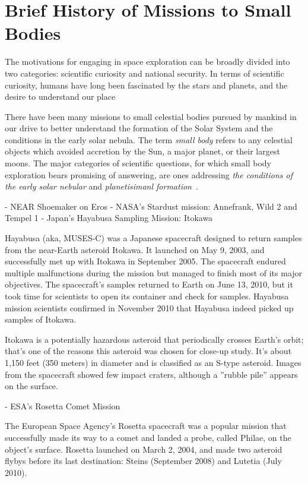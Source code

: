 \section{Brief History of Missions to Small Bodies}

The motivations for engaging in space exploration can be broadly divided into two categories: scientific curiosity and national security. In terms of scientific curiosity, humans have long been fascinated by the stars and planets, and the desire to understand our place

There have been many missions to small celestial bodies pursued by mankind in
our drive to better understand the formation of the Solar System and the
conditions in the early solar nebula. The term \textit{small body} refers to any
celestial objects which avoided accretion by the Sun, a major planet, or their
largest moons. The major categories of scientific questions, for which
small body exploration bears promising of answering, are ones addressing
\textit{the conditions of the early solar nebular} and \textit{planetisimanl
    formation}~\cite{Davidsson2021}.

- NEAR Shoemaker on Eros
- NASA's Stardust mission: Annefrank, Wild 2 and Tempel 1
- Japan's Hayabusa Sampling Mission: Itokawa

Hayabusa (aka, MUSES-C) was a Japanese spacecraft designed to return samples
from the near-Earth asteroid Itokawa. It launched on May 9, 2003, and
successfully met up with Itokawa in September 2005. The spacecraft endured
multiple malfunctions during the mission but managed to finish most of its major
objectives. The spacecraft's samples returned to Earth on June 13, 2010, but it
took time for scientists to open its container and check for samples. Hayabusa
mission scientists confirmed in November 2010 that Hayabusa indeed picked up
samples of Itokawa.

Itokawa is a potentially hazardous asteroid that periodically crosses Earth's
orbit; that's one of the reasons this asteroid was chosen for close-up study.
It's about 1,150 feet (350 meters) in diameter and is classified as an S-type
asteroid. Images from the spacecraft showed few impact craters, although a
''rubble pile'' appears on the surface.


- ESA's Rosetta Comet Mission

The European Space Agency's Rosetta spacecraft was a popular mission that
successfully made its way to a comet and landed a probe, called Philae, on the
object's surface. Rosetta launched on March 2, 2004, and made two asteroid
flybys before its last destination: Steins (September 2008) and Lutetia (July
2010).

